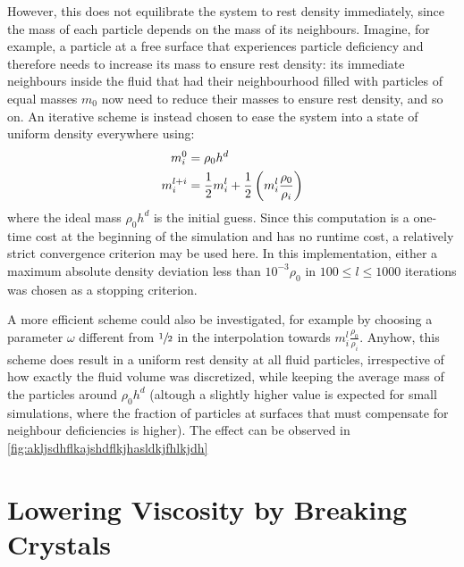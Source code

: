 However, this does not equilibrate the system  to rest density immediately, since the mass of each particle depends on the mass of its neighbours. Imagine, for example, a particle at a free surface that experiences particle deficiency and therefore needs to increase its mass to ensure rest density: its immediate neighbours inside the fluid that had their neighbourhood filled with particles of equal masses $m_0$ now need to reduce their masses to ensure rest density, and so on. An iterative scheme is instead chosen to ease the system into a state of uniform density everywhere using:
\begin{align}
  m_i^0     & = \rho_0 h^d                                                     \\
  m_i^{l+i} & = \frac{1}{2}m_i^l + \frac{1}{2}\left(m_i^l \frac{\rho_0}{\rho_i}\right)
\end{align}
where the ideal mass $\rho_0 h^d$ is the initial guess. Since this computation is a one-time cost at the beginning of the simulation and has no runtime cost, a relatively strict convergence criterion may be used here. In this implementation, either a maximum absolute density deviation less than $10^{-3}\rho_0$ in $100\leq l \leq 1000$ iterations was chosen as a stopping criterion.


A more efficient scheme could also be investigated, for example by choosing a parameter $\omega$ different from $\sfrac{1}{2}$ in the interpolation towards $m_i^l \frac{\rho_0}{\rho_i}$. Anyhow, this scheme does result in a uniform rest density at all fluid particles, irrespective of how exactly the fluid volume was discretized, while keeping the average mass of the particles around $\rho_0 h^d$ (altough a slightly higher value is expected for small simulations, where the fraction of particles at surfaces that must compensate for neighbour deficiencies is higher). The effect can be observed in \autoref{fig:akljsdhflkajshdflkjhasldkjfhlkjdh}

\section{Lowering Viscosity by Breaking Crystals}

